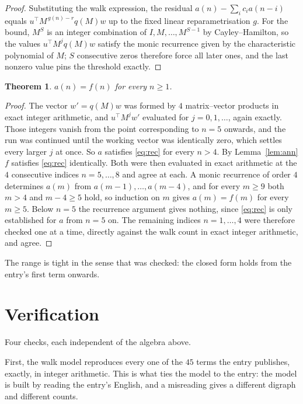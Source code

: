 \documentclass[11pt,a4paper]{article}
\theoremstyle{plain}
\newtheorem{theorem}{Theorem}
\theoremstyle{definition}
\begin{document}
\begin{proof}
Substituting the walk expression, the residual $a(n)-\sum_ic_ia(n-i)$ equals
$u^{\!\top}M^{\,g(n)-r}q(M)w$ up to the fixed linear reparametrisation $g$. For the bound,
$M^{S}$ is an integer combination of $I,M,\dots,M^{S-1}$ by Cayley--Hamilton, so the values
$u^{\!\top}M^{j}q(M)w$ satisfy the monic recurrence given by the characteristic polynomial of
$M$; $S$ consecutive zeros therefore force all later ones, and the last nonzero value pins the
threshold exactly.
\end{proof}

\begin{theorem}
$a(n)=f(n)$ for every $n\ge1$.
\end{theorem}

\begin{proof}
The vector $w'=q(M)w$ was formed by $4$ matrix--vector products in exact integer
arithmetic, and $u^{\!\top}M^{j}w'$ evaluated for $j=0,1,\dots$, again exactly. Those integers
vanish from the point corresponding to $n=5$ onwards, and the run was continued until the
working vector was identically zero, which settles every larger $j$ at once. So $a$ satisfies
\eqref{eq:rec} for every $n>4$. By Lemma~\ref{lem:ann} $f$ satisfies \eqref{eq:rec}
identically. Both were then evaluated in exact arithmetic at the $4$ consecutive indices
$n=5,\dots,8$ and agree at each. A monic recurrence of order $4$
determines $a(m)$ from $a(m-1),\dots,a(m-4)$, and for every $m\ge9$ both
$m>4$ and $m-4\ge5$ hold, so induction on $m$ gives $a(m)=f(m)$ for every
$m\ge5$.
Below $n=5$ the recurrence argument gives nothing, since \eqref{eq:rec} is only
established for $a$ from $n=5$ on. The remaining indices $n=1,\dots,4$ were
therefore checked one at a time, directly against the walk count in exact integer arithmetic,
and agree.
\end{proof}

The range is tight in the sense that was checked: the closed form holds from the entry's first term onwards.

\section{Verification}

Four checks, each independent of the algebra above.

First, the walk model reproduces every one of the $45$ terms the entry publishes,
exactly, in integer arithmetic. This is what ties the model to the entry: the model is built
by reading the entry's English, and a misreading gives a different digraph and different
counts.
\end{document}
